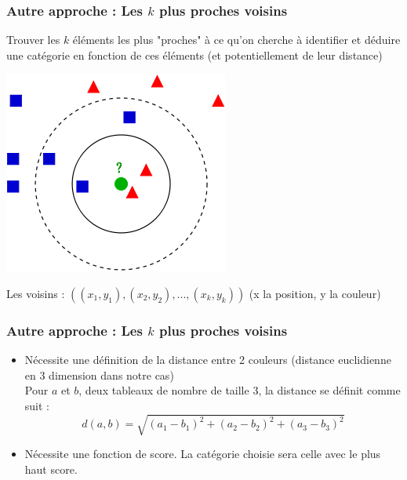 \documentclass[french]{beamer}
\begin{document}
\begin{frame}
\frametitle{Autre approche : Les $k$ plus proches voisins}
Trouver les $k$ éléments les plus "proches" à ce qu'on cherche à identifier et déduire une catégorie en fonction de ces éléments (et potentiellement de leur distance)
\begin{center}
\includegraphics[scale=0.4]{KnnClassification.png}
\end{center}
Les voisins : $((x_1,y_1),(x_2,y_2),...,(x_k,y_k))$ (x la position, y la couleur)
\end{frame}



\begin{frame}
\frametitle{Autre approche : Les $k$ plus proches voisins}
\begin{itemize}
\item{Nécessite une définition de la distance entre 2 couleurs (distance euclidienne en 3 dimension dans notre cas)}\\

Pour $a$ et $b$, deux tableaux de nombre de taille 3, la distance se définit comme suit :
$$ d(a,b) = \sqrt{(a_1-b_1)^2+(a_2-b_2)^2+(a_3-b_3)^2}$$

\item{Nécessite une fonction de score. La catégorie choisie sera celle avec le plus haut score.}
\end{itemize}

\end{frame}
\end{document}
